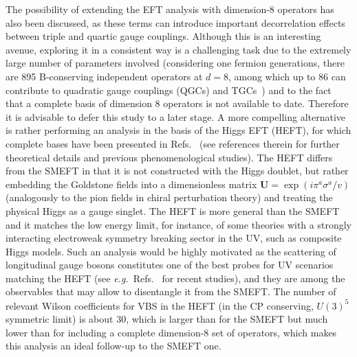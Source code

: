 The possibility of extending the EFT analysis with dimension-8 operators has also been discussed, as these terms can introduce important decorrelation effects between triple and quartic gauge couplings.
Although this is an interesting avenue, exploring it in a consistent way is a challenging task due to the extremely large number of parameters involved 
(considering one fermion generations, there are 895 B-conserving independent operators at $d=8$, among which up to 86 can contribute to quadratic gauge couplings (QGCs) and TGCs~\cite{Henning:2015alf}) 
and to the fact that a complete basis of dimension 8 operators is not available to date. 
Therefore it is advisable to defer this study to a later stage. A more compelling alternative is rather performing an analysis in the basis of the Higgs EFT (HEFT), 
for which complete bases have been presented in Refs.~\cite{Buchalla:2013rka,Brivio:2016fzo} (see references therein for further theoretical details and previous phenomenological studies).
The HEFT differs from the SMEFT in that it is not 
constructed with the Higgs doublet, but rather embedding the Goldstone fields into a dimensionless matrix $\mathbf{U}=\exp(i\pi^a\sigma^a/v)$ (analogously to the pion fields in chiral perturbation theory) and treating the physical Higgs as a gauge singlet. The HEFT is more general than the SMEFT and it matches the low energy limit, for instance, of some theories with a strongly interacting electroweak symmetry breaking sector in the UV, such as composite Higgs models.
Such an analysis would be highly motivated as the scattering of longitudinal gauge bosons constitutes one of the best probes for UV scenarios matching the HEFT (see \emph{e.g.}\ Refs.~\cite{Delgado:2013hxa,Delgado:2014jda} for recent studies), and they are among the observables that may allow to disentangle it from the SMEFT. The number of relevant Wilson coefficients for VBS in the HEFT (in the CP conserving, $U(3)^5$ symmetric limit) is about 30, which is larger than for the SMEFT but much lower than for including a complete dimension-8 set of operators, 
which makes this analysis an ideal follow-up to the SMEFT one.

